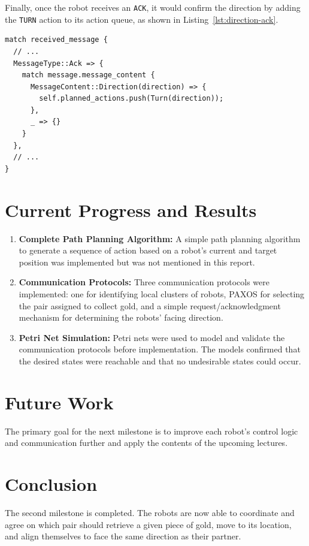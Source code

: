 \documentclass[12pt,a4paper]{article}
\begin{document}
Finally, once the robot receives an \texttt{ACK}, it would confirm the direction by adding the \texttt{TURN} action to its action queue, as shown in Listing~\ref{lst:direction-ack}.

\begin{lstlisting}[float, caption={Robot Receives \texttt{ACK}}, label={lst:direction-ack}]
match received_message {
  // ...
  MessageType::Ack => {
    match message.message_content {
      MessageContent::Direction(direction) => {
        self.planned_actions.push(Turn(direction));
      },
      _ => {}
    }
  },
  // ...
}
\end{lstlisting}
 
\section{Current Progress and Results}
\begin{enumerate}
    \item \textbf{Complete Path Planning Algorithm:} A simple path planning algorithm to generate a sequence of action based on a robot's current and target position was implemented but was not mentioned in this report.
    \item \textbf{Communication Protocols:} Three communication protocols were implemented: one for identifying local clusters of robots, PAXOS for selecting the pair assigned to collect gold, and a simple request/acknowledgment mechanism for determining the robots’ facing direction.
    \item \textbf{Petri Net Simulation:} Petri nets were used to model and validate the communication protocols before implementation. The models confirmed that the desired states were reachable and that no undesirable states could occur.
\end{enumerate}

\section{Future Work}
The primary goal for the next milestone is to improve each robot's control logic and communication further and apply the contents of the upcoming lectures.

\section{Conclusion}
The second milestone is completed. The robots are now able to coordinate and agree on which pair should retrieve a given piece of gold, move to its location, and align themselves to face the same direction as their partner. 
\end{document}
